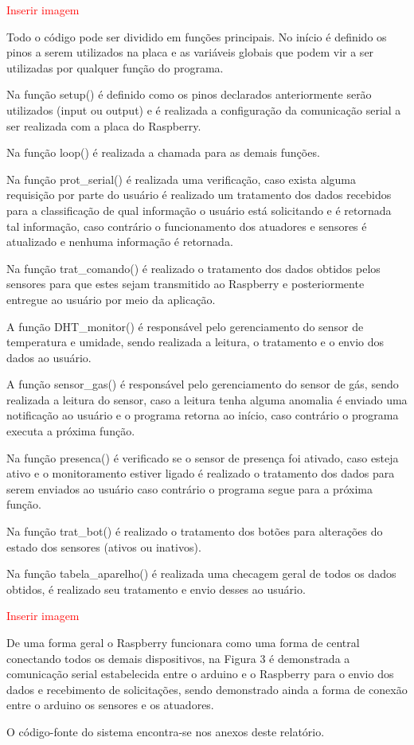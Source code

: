 \textcolor{red}{Inserir imagem}

\par Todo o código pode ser dividido em funções principais. No início é definido os pinos a serem utilizados na placa e as variáveis globais que podem vir a ser utilizadas por qualquer função do programa.
\par Na função setup() é definido como os pinos declarados anteriormente serão utilizados (input ou output) e é realizada a configuração da comunicação serial a ser realizada com a placa do Raspberry.
\par Na função loop() é realizada a chamada para as demais funções.
\par Na função prot\_serial() é realizada uma verificação, caso exista alguma requisição por parte do usuário é realizado um tratamento dos dados recebidos para a classificação de qual informação o usuário está solicitando e é retornada tal informação, caso contrário o funcionamento dos atuadores e sensores é atualizado e nenhuma informação é retornada.
\par Na função trat\_comando() é realizado o tratamento dos dados obtidos pelos sensores para que estes sejam transmitido ao Raspberry e posteriormente entregue ao usuário por meio da aplicação.
\par A função DHT\_monitor() é responsável pelo gerenciamento do sensor de temperatura e umidade, sendo realizada a leitura, o tratamento e o envio dos dados ao usuário.
\par A função sensor\_gas() é responsável pelo gerenciamento do sensor de gás, sendo realizada a leitura do sensor, caso a leitura tenha alguma anomalia é enviado uma notificação ao usuário e o programa retorna ao início, caso contrário o programa executa a próxima função.
\par Na função presenca() é verificado se o sensor de presença foi ativado, caso esteja ativo e o monitoramento estiver ligado é realizado o tratamento dos dados para serem enviados ao usuário caso contrário o programa segue para a próxima função.
\par Na função trat\_bot() é realizado o tratamento dos botões para alterações do estado dos sensores (ativos ou inativos).
\par Na função tabela\_aparelho() é realizada uma checagem geral de todos os dados obtidos, é realizado seu tratamento e envio desses ao usuário.

\textcolor{red}{Inserir imagem}

\par De uma forma geral o Raspberry funcionara como uma forma de central conectando todos os demais dispositivos, na Figura 3 é demonstrada a comunicação serial estabelecida entre o arduino e o Raspberry para o envio dos dados e recebimento de solicitações, sendo demonstrado ainda a forma de conexão entre o arduino os sensores e os atuadores.
\par O código-fonte do sistema encontra-se nos anexos deste relatório.
